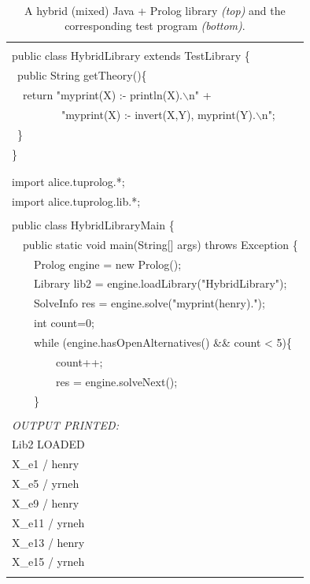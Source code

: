 \begin{table}
    \begin{center}{\tt
    \begin{tabular}{p{12cm}}\hline
    \\
    public class HybridLibrary extends TestLibrary \{\\
    ~public String getTheory()\{\\
    ~~return "myprint(X) :- println(X).$\backslash$n" +\\
    ~~~~~~~~~"myprint(X) :- invert(X,Y), myprint(Y).$\backslash$n";\\
    ~\}\\
    \} \\
    \\
    \hline
    \\
    import alice.tuprolog.*;\\
    import alice.tuprolog.lib.*;\\
    \\
    public class HybridLibraryMain \{\\
    ~~public static void main(String[] args) throws Exception \{\\
	~~~~Prolog engine = new Prolog();\\
	~~~~Library lib2 = engine.loadLibrary("HybridLibrary");\\
	~~~~SolveInfo res = engine.solve("myprint(henry).");\\
	~~~~int count=0;\\
	~~~~while (engine.hasOpenAlternatives() \&\& count < 5)\{\\
	~~~~~~~~count++;\\
	~~~~~~~~res = engine.solveNext();\\
	~~~~\}\\
    \\
    \textrm{\textit{OUTPUT PRINTED:}}\\
    Lib2  LOADED\\
	X\_e1 / henry\\
	X\_e5 / yrneh\\
	X\_e9 / henry\\
	X\_e11 / yrneh\\
	X\_e13 / henry\\
	X\_e15 / yrneh\\
    \\\hline
    \end{tabular}
    }\end{center}
    \caption{A hybrid (mixed) Java + Prolog library \textit{(top)} and the corresponding test program \textit{(bottom)}. }
    \label{tab:HybridLibrary}
\end{table}


